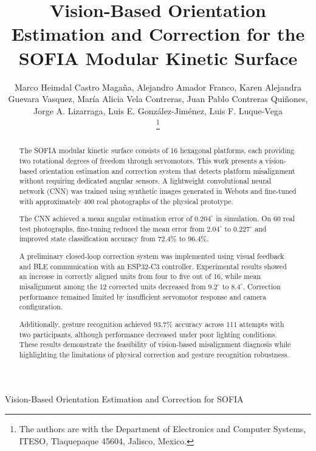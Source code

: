 \documentclass[lettersize,journal]{IEEEtran}
\begin{document}
	\title{Vision-Based Orientation Estimation and Correction for the
	SOFIA Modular Kinetic Surface}
	
	\author{
		Marco Heimdal Castro Magaña, Alejandro Amador Franco, Karen Alejandra Guevara Vasquez, María Alicia Vela Contreras, Juan Pablo Contreras Quiñones,
		Jorge A. Lizarraga, Luis E. González-Jiménez, Luis F. Luque-Vega
		
		\thanks{The authors are with the Department
			of Electronics and Computer Systems,
			ITESO, Tlaquepaque 45604, Jalisco, Mexico.}
	}
	
	
	{Vision-Based Orientation Estimation and Correction for SOFIA}
	
	\maketitle
	
	
	

\begin{abstract}
	The SOFIA modular kinetic surface consists
	of 16 hexagonal platforms, each providing
	two rotational degrees of freedom through
	servomotors. This work presents a
	vision-based orientation estimation and
	correction system that detects platform
	misalignment without requiring dedicated
	angular sensors. A lightweight convolutional
	neural network (CNN) was trained using
	synthetic images generated in Webots and
	fine-tuned with approximately 400 real
	photographs of the physical prototype.
	
	The CNN achieved a mean angular estimation
	error of $0.204^\circ$ in simulation.
	On 60 real test photographs, fine-tuning
	reduced the mean error from $2.04^\circ$
	to $0.227^\circ$ and improved state
	classification accuracy from 72.4\%
	to 96.4\%.
	
	A preliminary closed-loop correction system
	was implemented using visual feedback and
	BLE communication with an ESP32-C3 controller.
	Experimental results showed an increase
	in correctly aligned units from four to
	five out of 16, while mean misalignment
	among the 12 corrected units decreased
	from $9.2^\circ$ to $8.4^\circ$.
	Correction performance remained limited
	by insufficient servomotor response and
	camera configuration.
	
	Additionally, gesture recognition achieved
	93.7\% accuracy across 111 attempts with
	two participants, although performance
	decreased under poor lighting conditions.
	These results demonstrate the feasibility
	of vision-based misalignment diagnosis
	while highlighting the limitations of
	physical correction and gesture recognition
	robustness.
\end{abstract}
\end{document}
